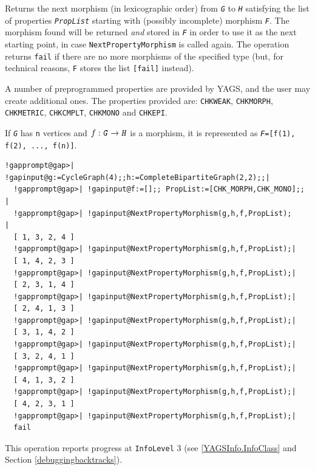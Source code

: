 \documentclass[a4paper,11pt]{report}
\begin{document}
{{{ 

Returns the next morphism (in lexicographic order) from \mbox{\texttt{\mdseries\slshape G}} to \mbox{\texttt{\mdseries\slshape H}} satisfying the list of properties \mbox{\texttt{\mdseries\slshape PropList}} starting with (possibly incomplete) morphism \mbox{\texttt{\mdseries\slshape F}}. The morphism found will be returned \emph{and} stored in \mbox{\texttt{\mdseries\slshape F}} in order to use it as the next starting point, in case \texttt{NextPropertyMorphism} is called again. The operation returns \texttt{fail} if there are no more morphisms of the specified type (but, for technical
reasons, \texttt{F} stores the list \texttt{[fail]} instead). 

A number of preprogrammed properties are provided by \textsf{YAGS}, and the user may create additional ones. The properties provided are: \texttt{CHK{\textunderscore}WEAK}, \texttt{CHK{\textunderscore}MORPH}, \texttt{CHK{\textunderscore}METRIC}, \texttt{CHK{\textunderscore}CMPLT}, \texttt{CHK{\textunderscore}MONO} and \texttt{CHK{\textunderscore}EPI}. 

If \mbox{\texttt{\mdseries\slshape G}} has \texttt{n} vertices and $f:\mbox{\texttt{\mdseries\slshape G}}\rightarrow \mbox{\texttt{\mdseries\slshape H}}$ is a morphism, it is represented as \texttt{\mbox{\texttt{\mdseries\slshape F}}=[f(1), f(2), ..., f(n)]}. 


\begin{Verbatim}[commandchars=!@|,fontsize=\small,frame=single,label=Example]
  !gapprompt@gap>| !gapinput@g:=CycleGraph(4);;h:=CompleteBipartiteGraph(2,2);;|
  !gapprompt@gap>| !gapinput@f:=[];; PropList:=[CHK_MORPH,CHK_MONO];;                   |
  !gapprompt@gap>| !gapinput@NextPropertyMorphism(g,h,f,PropList);                    |
  [ 1, 3, 2, 4 ]
  !gapprompt@gap>| !gapinput@NextPropertyMorphism(g,h,f,PropList);|
  [ 1, 4, 2, 3 ]
  !gapprompt@gap>| !gapinput@NextPropertyMorphism(g,h,f,PropList);|
  [ 2, 3, 1, 4 ]
  !gapprompt@gap>| !gapinput@NextPropertyMorphism(g,h,f,PropList);|
  [ 2, 4, 1, 3 ]
  !gapprompt@gap>| !gapinput@NextPropertyMorphism(g,h,f,PropList);|
  [ 3, 1, 4, 2 ]
  !gapprompt@gap>| !gapinput@NextPropertyMorphism(g,h,f,PropList);|
  [ 3, 2, 4, 1 ]
  !gapprompt@gap>| !gapinput@NextPropertyMorphism(g,h,f,PropList);|
  [ 4, 1, 3, 2 ]
  !gapprompt@gap>| !gapinput@NextPropertyMorphism(g,h,f,PropList);|
  [ 4, 2, 3, 1 ]
  !gapprompt@gap>| !gapinput@NextPropertyMorphism(g,h,f,PropList);|
  fail
\end{Verbatim}
 

This operation reports progress at \texttt{InfoLevel} 3 (see \ref{YAGSInfo.InfoClass} and Section \ref{debuggingbacktracks}). 

}}}
\end{document}
